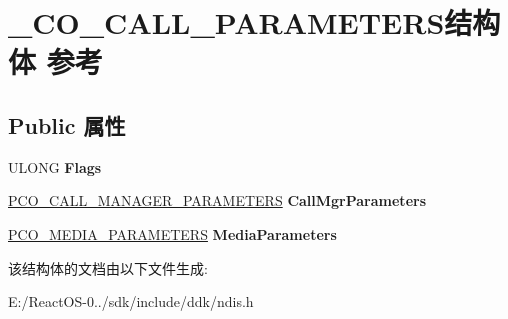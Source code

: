 \hypertarget{struct___c_o___c_a_l_l___p_a_r_a_m_e_t_e_r_s}{}\section{\+\_\+\+C\+O\+\_\+\+C\+A\+L\+L\+\_\+\+P\+A\+R\+A\+M\+E\+T\+E\+R\+S结构体 参考}
\label{struct___c_o___c_a_l_l___p_a_r_a_m_e_t_e_r_s}
\subsection*{Public 属性}
\begin{DoxyCompactItemize}
\item 
\mbox{\label{struct___c_o___c_a_l_l___p_a_r_a_m_e_t_e_r_s_a9bf3cfc1f9c4f44db3c252a87d1ab692}} 
U\+L\+O\+NG {\bfseries Flags}
\item 
\mbox{\label{struct___c_o___c_a_l_l___p_a_r_a_m_e_t_e_r_s_a8cb48d8c27c2528aa4dfc1683f645002}} 
\hyperlink{struct___c_o___c_a_l_l___m_a_n_a_g_e_r___p_a_r_a_m_e_t_e_r_s}{P\+C\+O\+\_\+\+C\+A\+L\+L\+\_\+\+M\+A\+N\+A\+G\+E\+R\+\_\+\+P\+A\+R\+A\+M\+E\+T\+E\+RS} {\bfseries Call\+Mgr\+Parameters}
\item 
\mbox{\label{struct___c_o___c_a_l_l___p_a_r_a_m_e_t_e_r_s_ab49115976cb41bfe3b1e0680583c1a87}} 
\hyperlink{struct___c_o___m_e_d_i_a___p_a_r_a_m_e_t_e_r_s}{P\+C\+O\+\_\+\+M\+E\+D\+I\+A\+\_\+\+P\+A\+R\+A\+M\+E\+T\+E\+RS} {\bfseries Media\+Parameters}
\end{DoxyCompactItemize}


该结构体的文档由以下文件生成\+:\begin{DoxyCompactItemize}
\item 
E\+:/\+React\+O\+S-\/0../sdk/include/ddk/ndis.\+h\end{DoxyCompactItemize}
